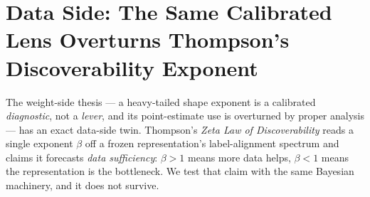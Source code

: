 
\newcommand{\DsPermP}{0.018}            %
\newcommand{\DsBetaSynth}{0.25}         %
\newcommand{\DsBetaReal}{-0.02}         %
\newcommand{\DsRhoSynth}{0.96}          %
\newcommand{\DsRhoReal}{0.53}           %
\newcommand{\DsCbpMae}{0.012}           %
\newcommand{\DsCbpReal}{0.14}           %
\newcommand{\DsPlReal}{0.69}            %
\newcommand{\DsAlphaLearned}{1.4\text{--}1.6}  %
\newcommand{\DsAlphaRand}{2.0}          %

\section{Data Side: The Same Calibrated Lens Overturns Thompson's Discoverability Exponent}
\label{sec:dataside}

The weight-side thesis --- a heavy-tailed shape exponent is a calibrated \emph{diagnostic}, not a
\emph{lever}, and its point-estimate use is overturned by proper analysis --- has an exact data-side
twin. Thompson's \emph{Zeta Law of Discoverability} reads a single exponent $\beta$ off a frozen
representation's label-alignment spectrum and claims it forecasts \emph{data sufficiency}: $\beta>1$
means more data helps, $\beta<1$ means the representation is the bottleneck. We test that claim with the
same Bayesian machinery, and it does not survive.

